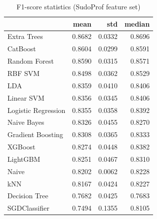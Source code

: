 \begin{table}
\caption{F1-score statistics (SudoProf feature set)}
\label{tab:f1_SudoProf_stats}
\begin{tabular}{lrrr}
\toprule
 & mean & std & median \\
\midrule
Extra Trees & 0.8682 & 0.0332 & 0.8696 \\
CatBoost & 0.8604 & 0.0299 & 0.8591 \\
Random Forest & 0.8590 & 0.0315 & 0.8571 \\
RBF SVM & 0.8498 & 0.0362 & 0.8529 \\
LDA & 0.8359 & 0.0410 & 0.8406 \\
Linear SVM & 0.8356 & 0.0345 & 0.8406 \\
Logistic Regression & 0.8355 & 0.0358 & 0.8392 \\
Naive Bayes & 0.8326 & 0.0455 & 0.8270 \\
Gradient Boosting & 0.8308 & 0.0365 & 0.8333 \\
XGBoost & 0.8274 & 0.0448 & 0.8382 \\
LightGBM & 0.8251 & 0.0467 & 0.8310 \\
Naive & 0.8202 & 0.0062 & 0.8228 \\
kNN & 0.8167 & 0.0424 & 0.8227 \\
Decision Tree & 0.7682 & 0.0425 & 0.7683 \\
SGDClassifier & 0.7494 & 0.1355 & 0.8105 \\
\bottomrule
\end{tabular}
\end{table}
